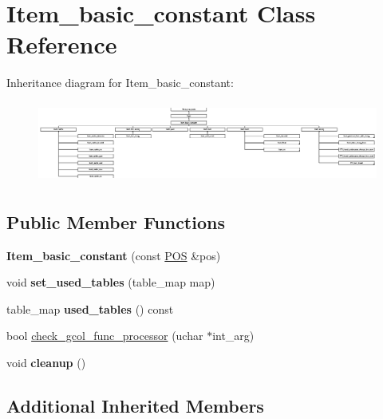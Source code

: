 \hypertarget{classItem__basic__constant}{}\section{Item\+\_\+basic\+\_\+constant Class Reference}
\label{classItem__basic__constant}
Inheritance diagram for Item\+\_\+basic\+\_\+constant\+:\begin{figure}[H]
\begin{center}
\leavevmode
\includegraphics[height=2.694663cm]{classItem__basic__constant}
\end{center}
\end{figure}
\subsection*{Public Member Functions}
\begin{DoxyCompactItemize}
\item 
\mbox{\label{classItem__basic__constant_a0fd565d7d6eb64e99e7c93d8bac94074}} 
{\bfseries Item\+\_\+basic\+\_\+constant} (const \mbox{\hyperlink{structYYLTYPE}{P\+OS}} \&pos)
\item 
\mbox{\label{classItem__basic__constant_aab00b0d309193ede1c8ec691dc18145b}} 
void {\bfseries set\+\_\+used\+\_\+tables} (table\+\_\+map map)
\item 
\mbox{\label{classItem__basic__constant_a8ee3349f26241163bb7fdaecd7727f81}} 
table\+\_\+map {\bfseries used\+\_\+tables} () const
\item 
bool \mbox{\hyperlink{classItem__basic__constant_a6240f3253090d2fc91f87a7a1cb773a7}{check\+\_\+gcol\+\_\+func\+\_\+processor}} (uchar $\ast$int\+\_\+arg)
\item 
\mbox{\label{classItem__basic__constant_ab6de8739d464405324944f110c63f586}} 
void {\bfseries cleanup} ()
\end{DoxyCompactItemize}
\subsection*{Additional Inherited Members}


